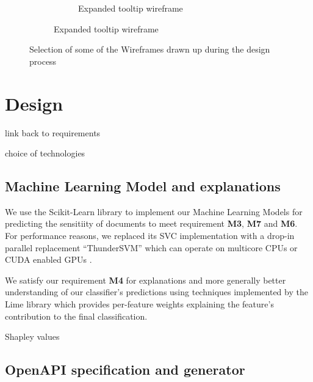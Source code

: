 \documentclass{l4proj}
\begin{document}
\begin{figure}[H]
\begin{subfigure}[b]{\linewidth}
\begin{subfigure}[b]{0.4\linewidth}
            \caption{Expanded tooltip wireframe}
            \label{fig:expanded-tooltip-wireframe}
        \end{subfigure}
    \end{subfigure}
    \caption{Selection of some of the Wireframes drawn up during the design process}
    \label{fig:wireframes}

\end{figure}


\chapter{Design}

link back to requirements

choice of technologies

\section{Machine Learning Model and explanations}


We use the Scikit-Learn library to implement our Machine Learning Models \autocite{pedregosaScikitlearnMachineLearning2011} for predicting the sensitiity of documents to meet requirement \textbf{M3}, \textbf{M7} and \textbf{M6}. For performance reasons, we replaced its SVC implementation with a drop-in parallel replacement ``ThunderSVM'' which can operate on multicore CPUs or CUDA enabled GPUs \autocite{wenThunderSVMFastSVM2018}.

We satisfy our requirement \textbf{M4} for explanations and more generally better understanding of our classifier's predictions using techniques implemented by the Lime library \autocite{ribeiroWhyShouldTrust2016} which provides per-feature weights explaining the feature's contribution to the final classification.

\autocite{lundbergUnifiedApproachInterpreting2017} Shapley values


\section{OpenAPI specification and generator}
\end{document}
